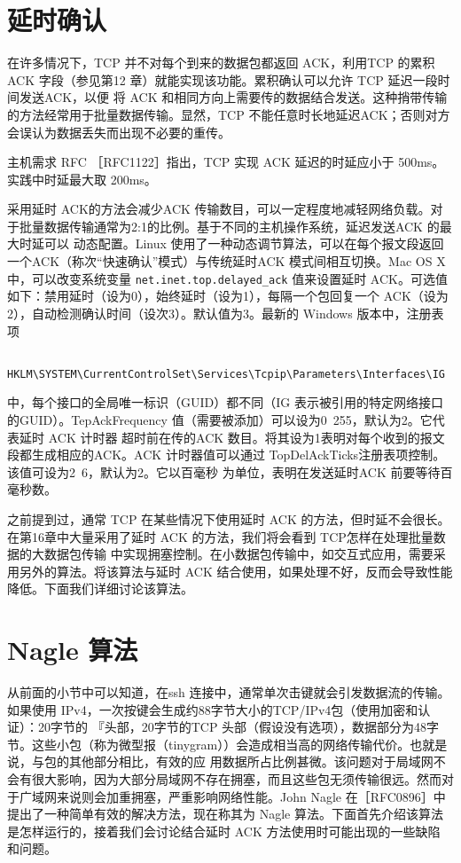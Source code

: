 \section{延时确认}
在许多情况下，TCP 并不对每个到来的数据包都返回 ACK，利用TCP 的累积ACK 字段（参见第12 章）就能实现该功能。累积确认可以允许 TCP 延迟一段时间发送ACK，以便
将 ACK 和相同方向上需要传的数据结合发送。这种捎带传输的方法经常用于批量数据传输。显然，TCP 不能任意时长地延迟ACK；否则对方会误认为数据丢失而出现不必要的重传。

\begin{tcolorbox}
    主机需求 RFC ［RFC1122］指出，TCP 实现 ACK 延迟的时延应小于 500ms。实践中时延最大取 200ms。
\end{tcolorbox}

采用延时 ACK的方法会减少ACK 传输数目，可以一定程度地减轻网络负载。对于批量数据传输通常为2:1的比例。基于不同的主机操作系统，延迟发送ACK 的最大时延可以
动态配置。Linux 使用了一种动态调节算法，可以在每个报文段返回一个ACK（称次“快速确认”模式）与传统延时ACK 模式间相互切换。Mac OS X 中，可以改变系统变量 
\verb|net.inet.top.delayed_ack| 值来设置延时 ACK。可选值如下：禁用延时（设为0），始终延时（设为1），每隔一个包回复一个 ACK（设为2），自动检测确认时间（设次3）。默认值为3。最新的
Windows 版本中，注册表项
\begin{verbatim}
    HKLM\SYSTEM\CurrentControlSet\Services\Tcpip\Parameters\Interfaces\IG
\end{verbatim}
中，每个接口的全局唯一标识（GUID）都不同（IG 表示被引用的特定网络接口的GUID）。TepAckFrequency 值（需要被添加）可以设为0~255，默认为2。它代表延时 ACK 计时器
超时前在传的ACK 数目。将其设为1表明对每个收到的报文段都生成相应的ACK。ACK 计时器值可以通过 TopDelAckTicks注册表项控制。该值可设为2~6，默认为2。它以百毫秒
为单位，表明在发送延时ACK 前要等待百毫秒数。

之前提到过，通常 TCP 在某些情况下使用延时 ACK 的方法，但时延不会很长。在第16章中大量采用了延时 ACK 的方法，我们将会看到 TCP怎样在处理批量数据的大数据包传输
中实现拥塞控制。在小数据包传输中，如交互式应用，需要采用另外的算法。将该算法与延时 ACK 结合使用，如果处理不好，反而会导致性能降低。下面我们详细讨论该算法。

\section{Nagle 算法}
从前面的小节中可以知道，在ssh 连接中，通常单次击键就会引发数据流的传输。如果使用 IPv4，一次按键会生成约88字节大小的TCP/IPv4包（使用加密和认证）：20字节的
『头部，20字节的TCP 头部（假设没有选项），数据部分为48字节。这些小包（称为微型报（tinygram））会造成相当高的网络传输代价。也就是说，与包的其他部分相比，有效的应
用数据所占比例甚微。该问题对于局域网不会有很大影响，因为大部分局域网不存在拥塞，而且这些包无须传输很远。然而对于广域网来说则会加重拥塞，严重影响网络性能。John
Nagle 在［RFC0896］中提出了一种简单有效的解决方法，现在称其为 Nagle 算法。下面首先介绍该算法是怎样运行的，接着我们会讨论结合延时 ACK 方法使用时可能出现的一些缺陷
和问题。

